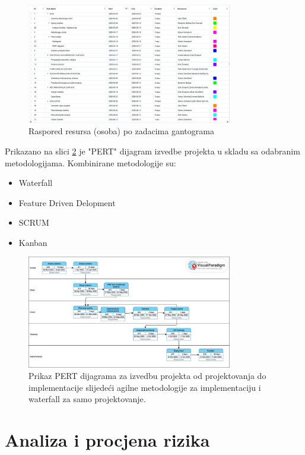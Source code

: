\begin{figure}[H]
    \centering
    \includegraphics[width=0.8\textwidth]{Slike/gant-opis.png}
    \caption{Raspored resursa (osoba) po zadacima gantograma}
    \label{fig:pi2}
\end{figure}


Prikazano na slici \ref{fig:pi3} je "PERT" dijagram izvedbe projekta u skladu sa odabranim metodologijama. Kombinirane metodologije su:
\begin{itemize}
    \item Waterfall
    \item Feature Driven Delopment
    \item SCRUM
    \item Kanban
\end{itemize}
\begin{figure}[H]
    \centering
    \includegraphics[width=0.8\textwidth]{Slike/PERT.png}
    \caption{Prikaz PERT dijagrama za izvedbu projekta od projektovanja do implementacije slijedeći agilne metodologije za implementaciju i waterfall za samo projektovanje.}
    \label{fig:pi3} 
\end{figure}
\newpage
\sloppy
\label{anaproc}
\section{Analiza i procjena rizika}

